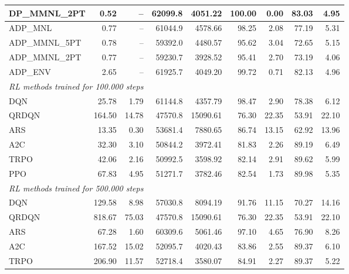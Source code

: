 \begin{samepage}
\begin{center}
\begin{tabular}{l|rr|rr|rr|rr}
    DP\_MMNL\_2PT &     0.52 &    -- &    62099.8 &    4051.22 &  100.00 &    0.00 &   83.03 &    4.95 \\
    \midrule
    ADP\_MNL     &     0.77 &    -- &    61044.9 &    4578.66 &   98.25 &    2.08 &   77.19 &    5.31 \\
    ADP\_MMNL\_5PT &     0.78 &    -- &    59392.0 &    4480.57 &   95.62 &    3.04 &   72.65 &    5.15 \\
    ADP\_MMNL\_2PT &     0.77 &    -- &    59230.7 &    3928.52 &   95.41 &    2.70 &   73.19 &    4.06 \\
    ADP\_ENV     &     2.65 &    -- &    61925.7 &    4049.20 &   99.72 &    0.71 &   82.13 &    4.96 \\
    \midrule
    \multicolumn{9}{l}{\textit{RL methods trained for 100.000 steps}} \\
    \midrule
    DQN          &    25.78 &     1.79 &    61144.8 &    4357.79 &   98.47 &    2.90 &   78.38 &    6.12 \\
    QRDQN        &   164.50 &    14.78 &    47570.8 &   15090.61 &   76.30 &   22.35 &   53.91 &   22.10 \\
    ARS          &    13.35 &     0.30 &    53681.4 &    7880.65 &   86.74 &   13.15 &   62.92 &   13.96 \\
    A2C          &    32.30 &     3.10 &    50844.2 &    3972.41 &   81.83 &    2.26 &   89.19 &    6.49 \\
    TRPO         &    42.06 &     2.16 &    50992.5 &    3598.92 &   82.14 &    2.91 &   89.62 &    5.99 \\
    PPO          &    67.83 &     4.95 &    51271.7 &    3782.46 &   82.54 &    1.73 &   89.98 &    5.35 \\
    \midrule
    \multicolumn{9}{l}{\textit{RL methods trained for 500.000 steps}} \\
    \midrule
    DQN          &   129.58 &     8.98 &    57030.8 &    8094.19 &   91.76 &   11.15 &   70.27 &   14.16 \\
    QRDQN        &   818.67 &    75.03 &    47570.8 &   15090.61 &   76.30 &   22.35 &   53.91 &   22.10 \\
    ARS          &    67.28 &     1.60 &    60309.6 &    5061.46 &   97.10 &    4.65 &   76.90 &    8.26 \\
    A2C          &   167.52 &    15.02 &    52095.7 &    4020.43 &   83.86 &    2.55 &   89.37 &    6.10 \\
    TRPO         &   206.90 &    11.57 &    52718.4 &    3580.07 &   84.91 &    2.27 &   89.37 &    5.22 \\

\end{tabular}
\end{center}
\end{samepage}
